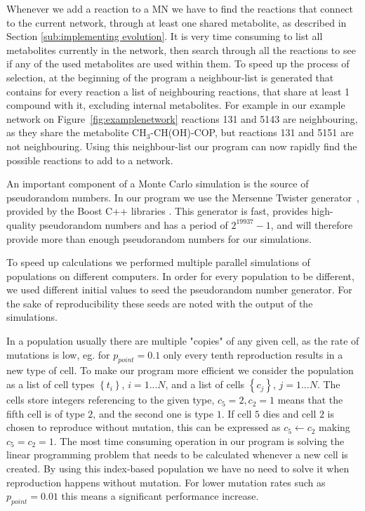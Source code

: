 \documentclass[a4paper,12pt]{article}
\begin{document}
	Whenever we add a reaction to a MN we have to find the reactions that connect to the current network, through at least one shared metabolite, as described in Section \ref{sub:implementing evolution}. It is very time consuming to list all metabolites currently in the network, then search through all the reactions to see if any of the used metabolites are used within them. To speed up the process of selection, at the beginning of the program a neighbour-list is generated that contains for every reaction a list of neighbouring reactions, that share at least 1 compound with it, excluding internal metabolites. For example in our example network on Figure~\ref{fig:examplenetwork} reactions 131 and 5143 are neighbouring, as they share the metabolite CH$_3$-CH(OH)-COP, but reactions 131 and 5151 are not neighbouring. Using this neighbour-list our program can now rapidly find the possible reactions to add to a network. 

	An important component of a Monte Carlo simulation is the source of pseudorandom numbers. In our program we use the Mersenne Twister generator~\cite{mersennetwister}, provided by the Boost C++ libraries \cite{boostlibraries}. This generator is fast, provides high-quality pseudorandom numbers and has a period of $2^{19937}-1$, and will therefore provide more than enough pseudorandom numbers for our simulations.

	To speed up calculations we performed multiple parallel simulations of populations on different computers. In order for every population to be different, we used different initial values to seed the pseudorandom number generator. For the sake of reproducibility these seeds are noted with the output of the simulations. 

In a population usually there are multiple "copies" of any given cell, as the rate of mutations is low, eg. for $p_{point}=0.1$ only every tenth reproduction results in a new type of cell. To make our program more efficient we consider the population as a list of cell types $ \left\{ t_i \right\}$, $i=1...N$, and a list of cells $\left\{ c_j \right\}$, $j=1...N$. The cells store integers referencing to the given type, $c_5=2, c_2=1$ means that the fifth cell is of type $2$, and the second one is type $1$. If cell $5$ dies and cell $2$ is chosen to reproduce without mutation, this can be expressed as $c_5 \leftarrow c_2$ making $c_5=c_2=1$. The most time consuming operation in our program is solving the linear programming problem that needs to be calculated whenever a new cell is created. By using this index-based population we have no need to solve it when reproduction happens without mutation. For lower mutation rates such as $p_{point}=0.01$ this means a significant performance increase. 
\end{document}
